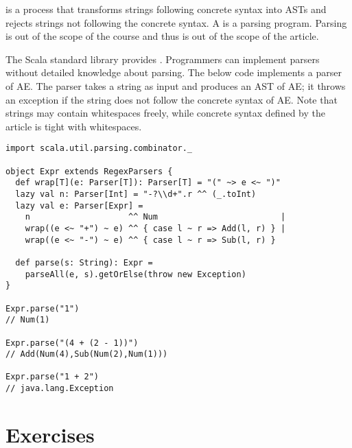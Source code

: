  is a process that transforms strings following concrete syntax
into ASTs and rejects strings not following the concrete syntax. A 
is a parsing program. Parsing is out of the scope of the course and thus is out
of the scope of the article.

The Scala standard library provides . Programmers can
implement parsers without detailed knowledge about parsing. The below code
implements a parser of AE. The parser takes a string as input and produces an AST
of AE; it throws an exception if the string does not follow the concrete syntax
of AE. Note that strings may contain whitespaces freely, while concrete syntax
defined by the article is tight with whitespaces.

\begin{verbatim}
import scala.util.parsing.combinator._

object Expr extends RegexParsers {
  def wrap[T](e: Parser[T]): Parser[T] = "(" ~> e <~ ")"
  lazy val n: Parser[Int] = "-?\\d+".r ^^ (_.toInt)
  lazy val e: Parser[Expr] =
    n                    ^^ Num                         |
    wrap((e <~ "+") ~ e) ^^ { case l ~ r => Add(l, r) } |
    wrap((e <~ "-") ~ e) ^^ { case l ~ r => Sub(l, r) }

  def parse(s: String): Expr =
    parseAll(e, s).getOrElse(throw new Exception)
}

Expr.parse("1")
// Num(1)

Expr.parse("(4 + (2 - 1))")
// Add(Num(4),Sub(Num(2),Num(1)))

Expr.parse("1 + 2")
// java.lang.Exception
\end{verbatim}

\newpage
\section{Exercises}

